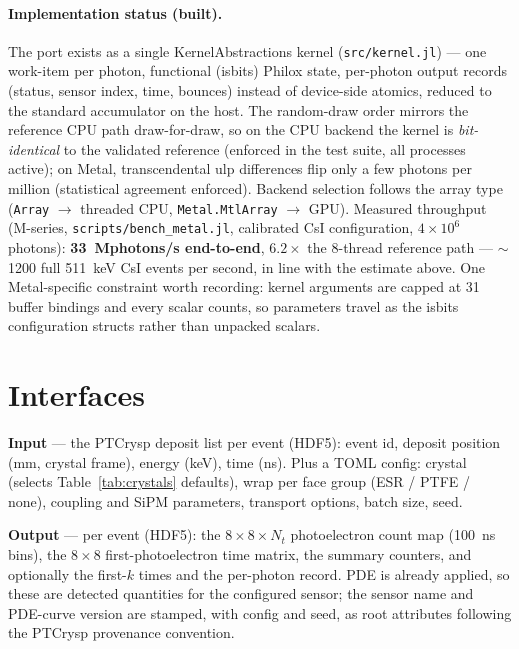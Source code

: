 \documentclass[11pt,a4paper]{article}
\newcommand{\csi}{CsI}
\begin{document}
\paragraph{Implementation status (built).} The port exists as a single
KernelAbstractions kernel (\texttt{src/kernel.jl}) --- one work-item per photon,
functional (isbits) Philox state, per-photon output records (status, sensor index,
time, bounces) instead of device-side atomics, reduced to the standard accumulator on
the host. The random-draw order mirrors the reference CPU path draw-for-draw, so on the
CPU backend the kernel is \emph{bit-identical} to the validated reference (enforced in
the test suite, all processes active); on Metal, transcendental ulp differences flip
only a few photons per million (statistical agreement enforced). Backend selection
follows the array type (\texttt{Array} $\to$ threaded CPU,
\texttt{Metal.MtlArray} $\to$ GPU). Measured throughput (M-series,
\texttt{scripts/bench\_metal.jl}, calibrated \csi{} configuration, $4\times10^6$
photons): \textbf{33~Mphotons/s end-to-end}, $6.2\times$ the 8-thread reference path
--- $\sim$1200 full 511~keV \csi{} events per second, in line with the estimate above.
One Metal-specific constraint worth recording: kernel arguments are capped at 31 buffer
bindings and every scalar counts, so parameters travel as the isbits configuration
structs rather than unpacked scalars.

\section{Interfaces}
\label{sec:interfaces}

\textbf{Input} --- the PTCrysp deposit list per event (HDF5): event id, deposit position
(mm, crystal frame), energy (keV), time (ns). Plus a TOML config: crystal (selects
Table~\ref{tab:crystals} defaults), wrap per face group (ESR / PTFE / none), coupling and
SiPM parameters, transport options, batch size, seed.

\textbf{Output} --- per event (HDF5): the $8\times8\times N_t$ photoelectron count map
(100~ns bins), the $8\times8$ first-photoelectron time matrix, the summary counters, and
optionally the first-$k$ times and the per-photon record. PDE is already applied, so these
are detected quantities for the configured sensor; the sensor name and PDE-curve version are
stamped, with config and seed, as root attributes following the PTCrysp provenance
convention.
\end{document}
